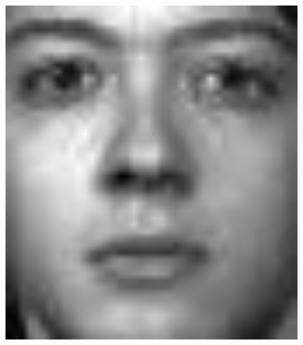 \documentclass[english,onecolumn]{IEEEtran}
\begin{document}
\begin{enumerate}
\begin{enumerate}
\begin{figure}[htbp]
{\begin{minipage}[t]{0.22\linewidth}
                \includegraphics[width=1\textwidth]{figures/p4/problem2/projectface_0_d-10.jpg}
                \end{minipage}
            }
\end{figure}
\end{enumerate}
\end{enumerate}
\end{document}

